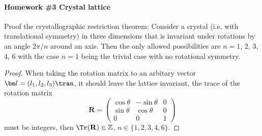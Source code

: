 
\paragraph{Homework \#3 Crystal lattice}

\begin{problem}
  Proof the crystallographic restriction theorem: Consider a crystal (i.e. with
  translational symmetry) in three dimensions that is invariant under rotations
  by an angle $2\pi/n$ around an axis. Then the only allowed possibilities are
  $n = 1$, $2$, $3$, $4$, $6$ with the case $n = 1$ being the trivial case
  with no rotational symmetry.
\end{problem}
\begin{solution}\begin{proof}
  When taking the rotation matrix to an arbitary vector
  $\bm l = (l_1, l_2, l_3)\tran$, it should leave the lattice invariant,
  the trace of the rotation matrix
  \[
    \mathbf R = \begin{pmatrix}
      \cos\theta & -\sin\theta & 0\\
      \sin\theta & \cos\theta & 0\\
      0 & 0 & 1
    \end{pmatrix}
  \]
  must be integers, then $\Tr(\mathbf R) \in \mathbb Z$,
  $n \in \{1,2,3,4,6\}$.
\end{proof}
\end{solution}

